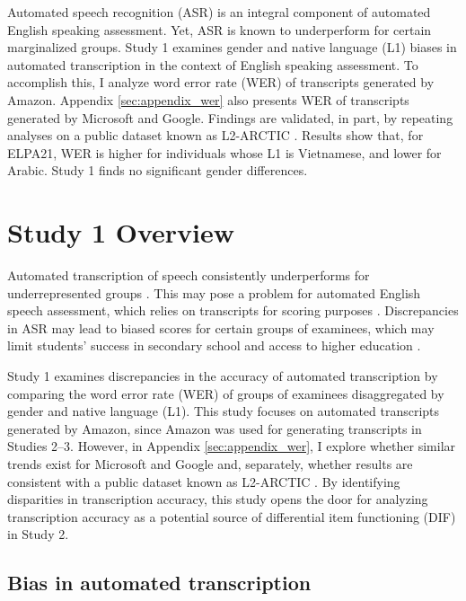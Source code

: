 \documentclass [PhD] {uclathes}
\begin{document}
Automated speech recognition (ASR) is an integral component of automated English speaking assessment. Yet, ASR is known to underperform for certain marginalized groups. Study 1 examines gender and native language (L1) biases in automated transcription in the context of English speaking assessment. To accomplish this, I analyze word error rate (WER) of transcripts generated by Amazon. Appendix \ref{sec:appendix_wer} also presents WER of transcripts generated by Microsoft and Google. Findings are validated, in part, by repeating analyses on a public dataset known as L2-ARCTIC \citep{zhao2018l2}. Results show that, for ELPA21, WER is higher for individuals whose L1 is Vietnamese, and lower for Arabic. Study 1 finds no significant gender differences.

\section{Study 1 Overview}

Automated transcription of speech consistently underperforms for underrepresented groups \citep{dichristofano2023, hutiri2022}. This may pose a problem for automated English speech assessment, which relies on transcripts for scoring purposes \citep{zechner2019automated, johnston2019using}. Discrepancies in ASR may lead to biased scores for certain groups of examinees, which may limit students' success in secondary school \citep{johnson2020} and access to higher education \citep{johnson2019effects}. 

Study 1 examines discrepancies in the accuracy of automated transcription by comparing the word error rate (WER) of groups of examinees disaggregated by gender and native language (L1). This study focuses on automated transcripts generated by Amazon, since Amazon was used for generating transcripts in Studies 2–3. However, in Appendix \ref{sec:appendix_wer}, I explore whether similar trends exist for Microsoft and Google and, separately, whether results are consistent with a public dataset known as L2-ARCTIC \citep[][Appendix \ref{sec:appendix_l2}]{zhao2018l2}. By identifying disparities in transcription accuracy, this study opens the door for analyzing transcription accuracy as a potential source of differential item functioning (DIF) in Study 2.

\subsection{Bias in automated transcription}
\end{document}
